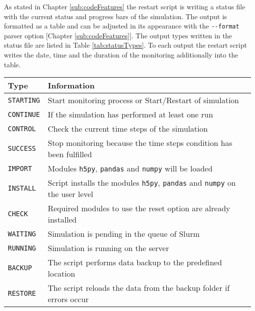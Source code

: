 As stated in Chapter \ref{sub:codeFeatures} the restart script is writing a status file with the current status and progress bars of the simulation. The output is formatted as a table and can be adjusted in its appearance with the \texttt{-\/-format} parser option [Chapter \ref{sub:codeFeatures}]. The output types written in the status file are listed in Table \ref{tab:statusTypes}. To each output the restart script writes the date, time and the duration of the monitoring additionally into the table. 
\begin{center}
    \captionsetup{type=table}
    \begin{tabular}{l | l}
        Type              & Information                                                                                     \\\hline
        \texttt{STARTING} & Start monitoring process or Start/Restart of simulation                                         \\
        \texttt{CONTINUE} & If the simulation has performed at least one run                                                \\\hline
        \texttt{CONTROL}  & Check the current time steps of the simulation                                                  \\
        \texttt{SUCCESS}  & Stop monitoring because the time steps condition has been fulfilled                             \\\hline
        \texttt{IMPORT}   & Modules \texttt{h5py}, \texttt{pandas} and \texttt{numpy} will be loaded                        \\
        \texttt{INSTALL}  & Script installs the modules \texttt{h5py}, \texttt{pandas} and \texttt{numpy} on the user level \\
        \texttt{CHECK}    & Required modules to use the reset option are already installed                                  \\\hline
        \texttt{WAITING}  & Simulation is pending in the queue of Slurm                                                     \\
        \texttt{RUNNING}  & Simulation is running on the server                                                             \\\hline
        \texttt{BACKUP}   & The script performs data backup to the predefined location                                      \\
        \texttt{RESTORE}  & The script reloads the data from the backup folder if errors occur                              \\

\end{tabular}
\end{center}
